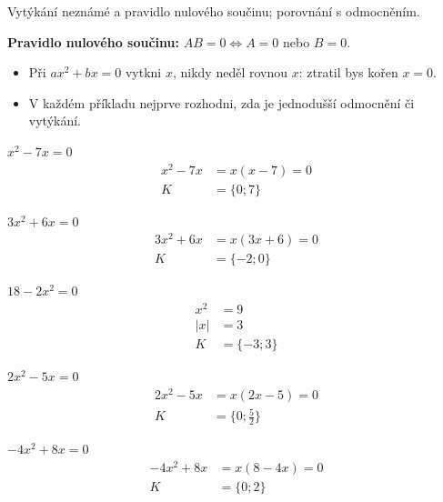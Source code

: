 \documentclass[11pt,a4paper]{article}
\begin{document}
Vytýkání neznámé a pravidlo nulového součinu; porovnání s odmocněním.
\begin{definiceBox}[title={Věta - Pravidlo nulového součinu}]
\textbf{Pravidlo nulového součinu:} $AB=0\iff A=0$ nebo $B=0$.
\end{definiceBox}
\begin{itemize}
\item Při $ax^2+bx=0$ vytkni $x$, nikdy neděl rovnou $x$: ztratil bys kořen $x=0$.
\item V každém příkladu nejprve rozhodni, zda je jednodušší odmocnění či vytýkání.
\end{itemize}
\begin{prikladReseniBox}[title={Příklad 1}]
$x^{2} - 7x=0$
\tcblower
\[
\begin{aligned}
x^{2} - 7x&=x(x - 7)=0\\[2pt]
K&=\{0;7\}
\end{aligned}
\]
\end{prikladReseniBox}
\begin{prikladReseniBox}[title={Příklad 2}]
$3x^{2} + 6x=0$
\tcblower
\[
\begin{aligned}
3x^{2} + 6x&=x(3x + 6)=0\\[2pt]
K&=\{-2;0\}
\end{aligned}
\]
\end{prikladReseniBox}
\begin{prikladReseniBox}[title={Příklad 3}]
$18 - 2x^{2}=0$
\tcblower
\[
\begin{aligned}
x^2&=9\\|x|&=3\\[2pt]
K&=\{-3;3\}
\end{aligned}
\]
\end{prikladReseniBox}
\begin{zadaniReseniBox}[title={Samostatná práce 1}]
$2x^{2} - 5x=0$
\tcblower
\[
\begin{aligned}
2x^{2} - 5x&=x(2x - 5)=0\\[2pt]
K&=\{0;\frac{5}{2}\}
\end{aligned}
\]
\end{zadaniReseniBox}
\begin{zadaniReseniBox}[title={Samostatná práce 2}]
$- 4x^{2} + 8x=0$
\tcblower
\[
\begin{aligned}
- 4x^{2} + 8x&=x(8 - 4x)=0\\[2pt]
K&=\{0;2\}
\end{aligned}
\]
\end{zadaniReseniBox}
\end{document}
